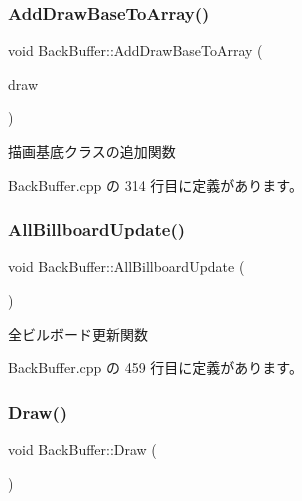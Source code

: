 \subsubsection{\texorpdfstring{Add\+Draw\+Base\+To\+Array()}{AddDrawBaseToArray()}}
{\footnotesize\ttfamily void Back\+Buffer\+::\+Add\+Draw\+Base\+To\+Array (\begin{DoxyParamCaption}\item[{\mbox{\hyperlink{class_draw_base}{Draw\+Base}} $\ast$}]{draw }\end{DoxyParamCaption})}



描画基底クラスの追加関数 



 Back\+Buffer.\+cpp の 314 行目に定義があります。

\mbox{\label{class_back_buffer_a1b93b223c80549e7b11e1d91b56552bc}} 
\subsubsection{\texorpdfstring{All\+Billboard\+Update()}{AllBillboardUpdate()}}
{\footnotesize\ttfamily void Back\+Buffer\+::\+All\+Billboard\+Update (\begin{DoxyParamCaption}{ }\end{DoxyParamCaption})\hspace{0.3cm}{\ttfamily [private]}}



全ビルボード更新関数 



 Back\+Buffer.\+cpp の 459 行目に定義があります。

\mbox{\label{class_back_buffer_adb51191c002489e4faac54199449e9ef}} 
\subsubsection{\texorpdfstring{Draw()}{Draw()}}
{\footnotesize\ttfamily void Back\+Buffer\+::\+Draw (\begin{DoxyParamCaption}{ }\end{DoxyParamCaption})}



